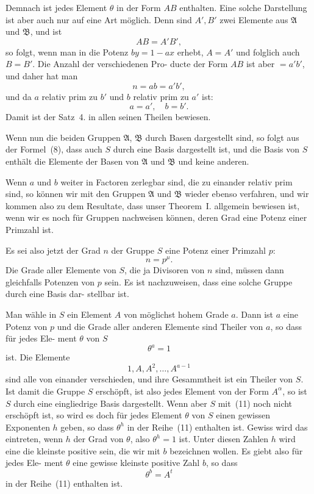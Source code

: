 \documentclass[12pt,a4paper]{article}
\theoremstyle{plain}
\theoremstyle{definition}
\theoremstyle{remark}
\begin{document}
Demnach ist jedes Element $\theta$ in der Form $AB$ enthalten.
Eine solche Darstellung ist aber auch nur auf eine Art möglich.
Denn sind $A', B'$ zwei Elemente aus $\mathfrak{A}$ und $\mathfrak{B}$, und ist
\[
AB = A'B',
\]
so folgt, wenn man in die Potenz $by = 1 - ax$ erhebt, $A = A'$
und folglich auch $B = B'$. Die Anzahl der verschiedenen Pro-
ducte der Form $AB$ ist aber $= a'b'$, und daher hat man
\[
n = ab = a'b',
\]
und da $a$ relativ prim zu $b'$ und $b$ relativ prim zu $a'$ ist:
\[
a = a', \quad b = b'.
\]
Damit ist der Satz~4. in allen seinen Theilen bewiesen.

Wenn nun die beiden Gruppen $\mathfrak{A}$, $\mathfrak{B}$ durch Basen dargestellt
sind, so folgt aus der Formel~(8), dass auch $S$ durch eine Basis
dargestellt ist, und die Basis von $S$ enthält die Elemente der
Basen von $\mathfrak{A}$ und $\mathfrak{B}$ und keine anderen.


Wenn $a$ und $b$ weiter in Factoren zerlegbar sind, die zu
einander relativ prim sind, so können wir mit den Gruppen $\mathfrak{A}$
und $\mathfrak{B}$ wieder ebenso verfahren, und wir kommen also zu dem
Resultate, dass unser Theorem~I. allgemein bewiesen ist, wenn
wir es noch für Gruppen nachweisen können, deren Grad eine
Potenz einer Primzahl ist.

Es sei also jetzt der Grad $n$ der Gruppe $S$ eine Potenz
einer Primzahl $p$:
\begin{equation}\tag{9}
n = p^\mu.
\end{equation}
Die Grade aller Elemente von $S$, die ja Divisoren von $n$
sind, müssen dann gleichfalls Potenzen von $p$ sein. Es ist
nachzuweisen, dass eine solche Gruppe durch eine Basis dar-
stellbar ist.

Man wähle in $S$ ein Element $A$ von möglichst hohem
Grade $a$. Dann ist $a$ eine Potenz von $p$ und die Grade aller
anderen Elemente sind Theiler von $a$, so dass für jedes Ele-
ment $\theta$ von $S$
\begin{equation}\tag{10}
\theta^a = 1
\end{equation}
ist. Die Elemente
\begin{equation}\tag{11}
1, A, A^2, \ldots, A^{a-1}
\end{equation}
sind alle von einander verschieden, und ihre Gesammtheit ist ein
Theiler von $S$. Ist damit die Gruppe $S$ erschöpft, ist also jedes
Element von der Form $A^\alpha$, so ist $S$ durch eine eingliedrige
Basis dargestellt. Wenn aber $S$ mit~(11) noch nicht erschöpft
ist, so wird es doch für jedes Element $\theta$ von $S$ einen gewissen
Exponenten $h$ geben, so dass $\theta^h$ in der Reihe~(11) enthalten ist.
Gewiss wird das eintreten, wenn $h$ der Grad von $\theta$, also $\theta^h = 1$
ist. Unter diesen Zahlen $h$ wird eine die kleinste positive sein,
die wir mit $b$ bezeichnen wollen. Es giebt also für jedes Ele-
ment $\theta$ eine gewisse kleinste positive Zahl $b$, so dass
\begin{equation}\tag{12}
\theta^b = A^t
\end{equation}
in der Reihe~(11) enthalten ist.
\end{document}
